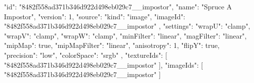 {
  "id": "8482f558ad371b346d922d498eb029c7__impostor",
  "name": "Spruce A Impostor",
  "version": 1,
  "source": {
    "kind": "image",
    "imageId": "8482f558ad371b346d922d498eb029c7__impostor"
  },
  "settings": {
    "wrapU": "clamp",
    "wrapV": "clamp",
    "wrapW": "clamp",
    "minFilter": "linear",
    "magFilter": "linear",
    "mipMap": true,
    "mipMapFilter": "linear",
    "anisotropy": 1,
    "flipY": true,
    "precision": "low",
    "colorSpace": "srgb"
  },
  "textureIds": [
    "8482f558ad371b346d922d498eb029c7__impostor"
  ],
  "imageIds": [
    "8482f558ad371b346d922d498eb029c7__impostor"
  ]
}
